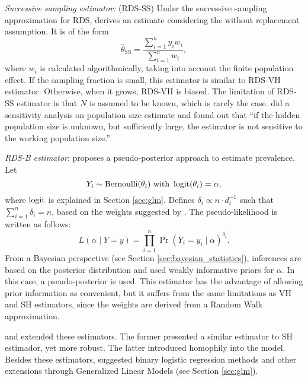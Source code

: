 \begin{alineas}
  \item {\em Successive sampling estimator:} (RDS-SS) Under the successive sampling
  approximation for RDS, \textcite[p. 137-138]{gile2011improved} derives an
  estimate considering the without replacement assumption. It is of the form 
  \begin{equation}
    \label{eq:successive-sampling-estimator}
    \hat{\theta}_{\mathrm{SS}} = \frac{\sum_{i=1}^n y_i w_i}{\sum_{i=1}^n w_i}, 
  \end{equation}
  where $w_i$ is calculated algorithmically, taking into account the finite
  population effect. If the sampling fraction is small, this estimator is
  similar to RDS-VH estimator. Otherwise, when it grows, RDS-VH is biased. The
  limitation of RDS-SS estimator is that $N$ is assumed to be known, which is
  rarely the case. \textcite[p. 140]{gile2011improved} did a sensitivity
  analysis on population size estimate and found out that ``if the hidden
  population size is unknown, but sufficiently large, the
  estimator is not sensitive to the working population size.'' \cite[p. 16]{gile2015network} 

  \item {\em RDS-B estimator}: \cite{bastos2018hiv} proposes a
  pseudo-posterior approach to estimate prevalence. Let 
  \begin{equation*}
    Y_i \sim \operatorname{Bernoulli}(\theta_i) \text{ with } \operatorname{logit}(\theta_i) = \alpha,
  \end{equation*}  
  where $\operatorname{logit}$ is explained in Section \ref{sec:glm}. Defines 
  $\delta_i \propto n \cdot d_i^{-1}$ such that $\sum_{i=1}^n \delta_i = n$,
  based on the weights suggested by \textcite{volz2008probability}. The
  pseudo-likelihood is written as follows: 
  \begin{equation*}
    L(\alpha \mid Y = y) = \prod_{i=1}^n \Pr(Y_i = y_i \mid \alpha)^{\delta_i}. 
  \end{equation*}
  From a Bayesian perspective (see Section \ref{sec:bayesian_statistics}), 
  inferences are based on the posterior distribution and 
  \textcite[p. S18]{bastos2018hiv} used weakly informative priors for
  $\alpha$. In this case, a pseudo-posterior is used. This estimator has the
  advantage of allowing prior information as convenient, but it suffers from
  the same limitations as VH and SH estimators, since the weights are derived
  from a Random Walk approximation. 

\end{alineas}

\textcite{ott2019reduced} and \textcite{fellows2019respondent} extended these
estimators. The former presented
a similar estimator to SH estimador, yet more robust. The latter introduced
homophily into the model. Besides these estimators,
\textcite{avery2021statistical} suggested binary logistic
regression methods and other extensions through Generalized Linear Models (see
Section \ref{sec:glm}). 

